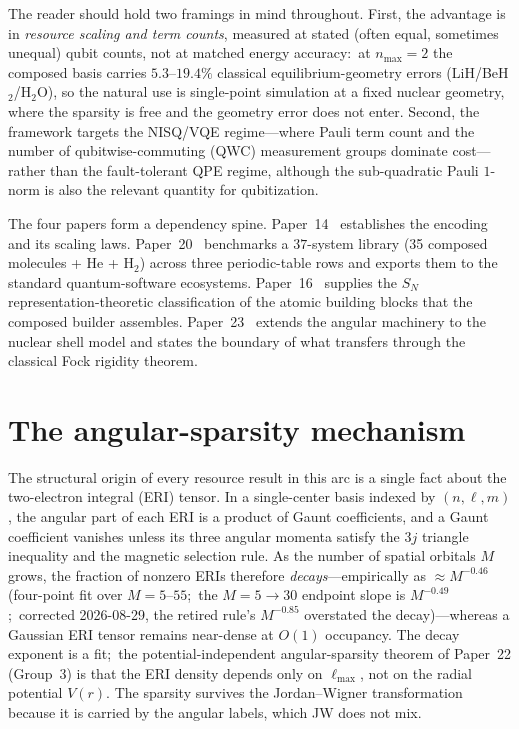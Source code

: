 \documentclass[aps,pra,twocolumn,superscriptaddress,longbibliography]{revtex4-2}
\newcommand{\gvq}[2]{#2}
\begin{document}
The reader should hold two framings in mind throughout.  First, the
advantage is in \emph{resource scaling and term counts}, measured at
stated (often equal, sometimes unequal) qubit counts, not at matched
energy accuracy:\ at $n_{\max}=2$ the
composed basis carries $5.3$--$19.4\%$ classical equilibrium-geometry errors
(LiH/BeH$_2$/H$_2$O), so the natural use is single-point simulation at a
fixed nuclear geometry, where the sparsity is free and the geometry
error does not enter.  Second, the framework targets the NISQ/VQE
regime---where Pauli term count and the number of qubitwise-commuting
(QWC) measurement groups dominate cost---rather than the fault-tolerant
QPE regime, although the sub-quadratic Pauli $1$-norm is also the
relevant quantity for qubitization.

The four papers form a dependency spine.
Paper~14~\cite{loutey_paper14} establishes the encoding and its scaling
laws.  Paper~20~\cite{loutey_paper20} benchmarks a $37$-system library
(35 composed molecules + He + H$_2$) across three periodic-table rows and exports them to the
standard quantum-software ecosystems.  Paper~16~\cite{loutey_paper16}
supplies the $S_N$ representation-theoretic classification of the atomic
building blocks that the composed builder assembles.
Paper~23~\cite{loutey_paper23} extends the angular machinery to the
nuclear shell model and states the boundary of what transfers through
the classical Fock rigidity theorem.

\section{The angular-sparsity mechanism}

The structural origin of every resource result in this arc is a single
fact about the two-electron integral (ERI) tensor.  In a single-center
basis indexed by $(n,\ell,m)$, the angular part of each ERI is a product
of Gaunt coefficients, and a Gaunt coefficient vanishes unless its three
angular momenta satisfy the $3j$ triangle inequality and the magnetic
selection rule.  As the number of spatial orbitals $M$ grows, the
fraction of nonzero ERIs therefore \emph{decays}---empirically as
$\approx M^{\gvq{eri_decay_4pt}{-0.46}}$ (four-point fit over $M = 5$--$55$;\ the
$M = 5 \to 30$ endpoint slope is $M^{\gvq{eri_decay_2pt}{-0.49}}$;\ corrected 2026-08-29, the retired rule's
$M^{-0.85}$ overstated the decay)---whereas a Gaussian ERI tensor remains near-dense at
$O(1)$ occupancy.  The decay exponent is a fit;\ the potential-independent
angular-sparsity theorem of Paper~22 (Group~3) is that the ERI density
depends only on $\ell_{\max}$, not on the radial potential $V(r)$.  The sparsity
survives the Jordan--Wigner transformation because it is carried by the
angular labels, which JW does not mix.
\end{document}
